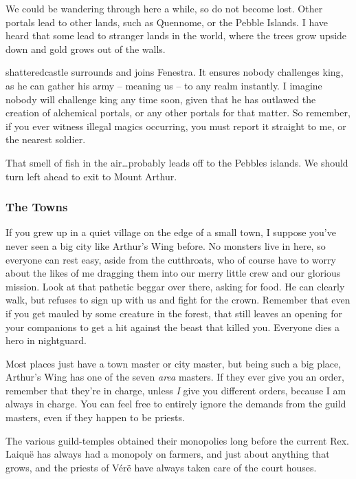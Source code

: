 \begin{multicols}{2}
\begin{exampletext}
	We could be wandering through here a while, so do not become lost.
	Other portals lead to other lands, such as Quennome, or the Pebble Islands.
	I have heard that some lead to stranger lands in the world, where the trees grow upside down and gold grows out of the walls.

	\Gls{shatteredcastle} surrounds and joins Fenestra.
	It ensures nobody challenges \gls{king}, as he can gather his army -- meaning us -- to any realm instantly.
	I imagine nobody will challenge \gls{king} any time soon, given that he has outlawed the creation of alchemical portals, or any other portals for that matter.
	So remember, if you ever witness illegal magics occurring, you must report it straight to me, or the nearest soldier.

	That smell of fish in the air\ldots probably leads off to the Pebbles islands.
	We should turn left ahead to exit to Mount Arthur.

\end{exampletext}

\subsubsection{The Towns}

\begin{exampletext}

	If you grew up in a quiet village on the edge of a small town, I suppose you've never seen a big city like Arthur's Wing before.
	No monsters live in here, so everyone can rest easy, aside from the cutthroats, who of course have to worry about the likes of me dragging them into our merry little crew and our glorious mission.
	Look at that pathetic beggar over there, asking for food.
	He can clearly walk, but refuses to sign up with us and fight for the crown.
	Remember that even if you get mauled by some creature in the forest, that still leaves an opening for your companions to get a hit against the beast that killed you.
	Everyone dies a hero in \gls{nightguard}.

	Most places just have a town master or city master, but being such a big place, Arthur's Wing has one of the seven \textit{area} masters.
	If they ever give you an order, remember that they're in charge, unless \emph{I} give you different orders, because I am always in charge.
	You can feel free to entirely ignore the demands from the guild masters, even if they happen to be priests.

	The various guild-temples obtained their monopolies long before the current Rex.
	Laiqu\"e has always had a monopoly on farmers, and just about anything that grows, and the priests of V\'er\"e have always taken care of the court houses.


\end{exampletext}
\end{multicols}
